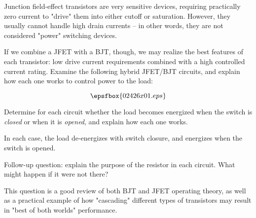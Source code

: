 

Junction field-effect transistors are very sensitive devices, requiring practically zero current to "drive" them into either cutoff or saturation.  However, they usually cannot handle high drain currents -- in other words, they are not considered "power" switching devices.

If we combine a JFET with a BJT, though, we may realize the best features of each transistor: low drive current requirements combined with a high controlled current rating.  Examine the following hybrid JFET/BJT circuits, and explain how each one works to control power to the load:

$$\epsfbox{02426x01.eps}$$

Determine for each circuit whether the load becomes energized when the switch is {\it closed} or when it is {\it opened}, and explain how each one works.







In each case, the load de-energizes with switch closure, and energizes when the switch is opened.

\vskip 10pt

Follow-up question: explain the purpose of the resistor in each circuit.  What might happen if it were not there?







This question is a good review of both BJT and JFET operating theory, as well as a practical example of how "cascading" different types of transistors may result in "best of both worlds" performance.




